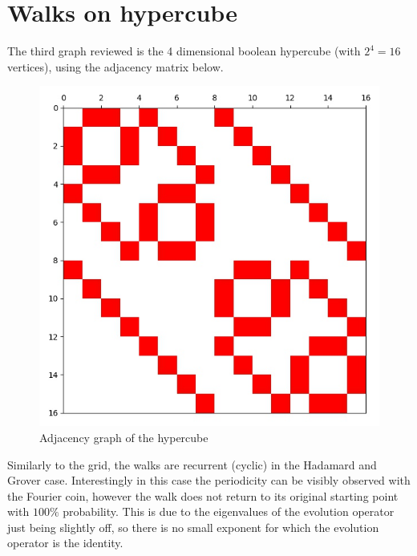 \section{Walks on hypercube}

The third graph reviewed is the 4 dimensional boolean hypercube (with $2^4 = 16$ vertices), using the adjacency matrix below.

\begin{figure}[H]
\centering
\includegraphics[width=0.5\linewidth]{./figures/results/hypercube/graph.jpg}
\caption{Adjacency graph of the hypercube}
\end{figure}

Similarly to the grid, the walks are recurrent (cyclic) in the Hadamard and Grover case. Interestingly in this case the periodicity can be visibly observed with the Fourier coin, however the walk does not return to its
original starting point with $100\%$ probability. This is due to the eigenvalues of the evolution operator
just being slightly off, so there is no small exponent for which the evolution operator is the identity.

